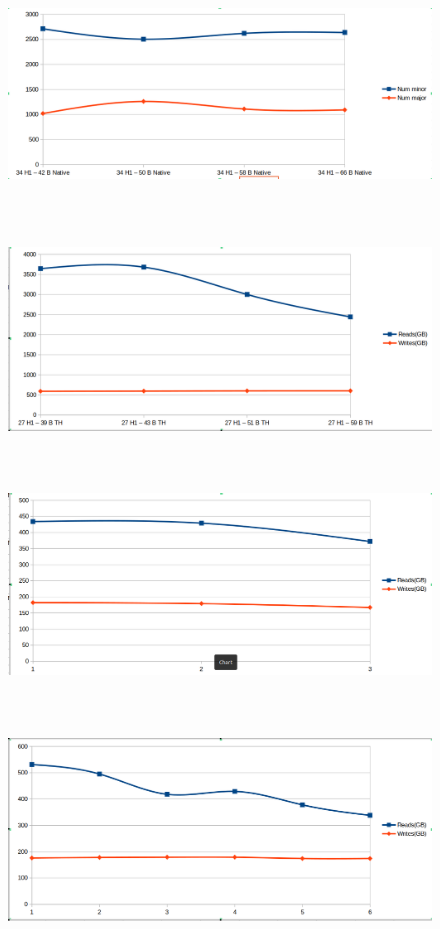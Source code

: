 \documentclass[twocolumn,10pt]{asme2e}
\begin{document}
\begin{figure}[h!]
        \includegraphics[width=12cm,height=6cm]{rw_linr_pc_native.png}
\end{figure}

\begin{figure}[h!]
        \includegraphics[width=12cm,height=6cm]{rw_linr_pc_th.png}
\end{figure}

\begin{figure}[h!]
        \includegraphics[width=12cm,height=6cm]{rw_pr_h1_th.png}
\end{figure}

\begin{figure}[h!]
        \includegraphics[width=12cm,height=6cm]{rw_pr_pc_th.png}
\end{figure}
\end{document}
